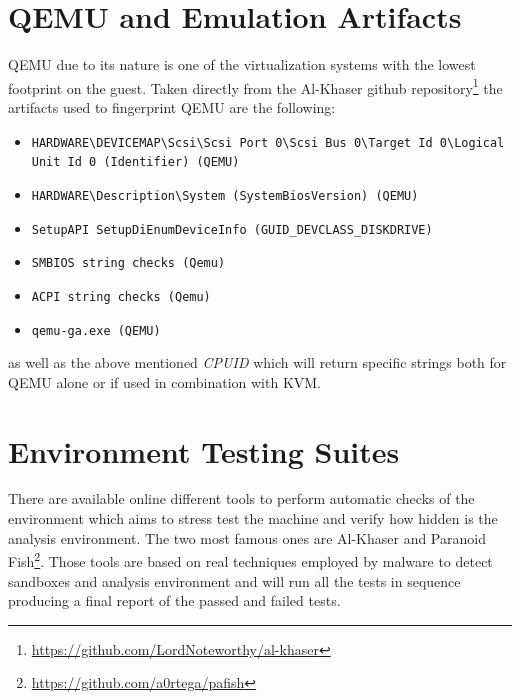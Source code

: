 \section{QEMU and Emulation Artifacts}

QEMU due to its nature is one of the virtualization systems with the lowest footprint on the guest. Taken directly from the Al-Khaser github repository\footnote{\url{https://github.com/LordNoteworthy/al-khaser}} the artifacts used to fingerprint QEMU are the following:

\begin{itemize}
    \item \lstinline{HARDWARE\DEVICEMAP\Scsi\Scsi Port 0\Scsi Bus 0\Target Id 0\Logical Unit Id 0 (Identifier) (QEMU)}
    \item \lstinline{HARDWARE\Description\System (SystemBiosVersion) (QEMU)}
    \item \lstinline{SetupAPI SetupDiEnumDeviceInfo (GUID_DEVCLASS_DISKDRIVE)}
    \item \lstinline{SMBIOS string checks (Qemu)}
    \item \lstinline{ACPI string checks (Qemu)}
    \item \lstinline{qemu-ga.exe (QEMU)}
\end{itemize}

as well as the above mentioned \textit{CPUID} which will return specific strings both for QEMU alone or if used in combination with KVM.


\section{Environment Testing Suites}


There are available online different tools to perform automatic checks of the environment which aims to stress test the machine and verify how hidden is the analysis environment. The two most famous ones are Al-Khaser and Paranoid Fish\footnote{\url{https://github.com/a0rtega/pafish}}. Those tools are based on real techniques employed by malware to detect sandboxes and analysis environment and will run all the tests in sequence producing a final report of the passed and failed tests.

